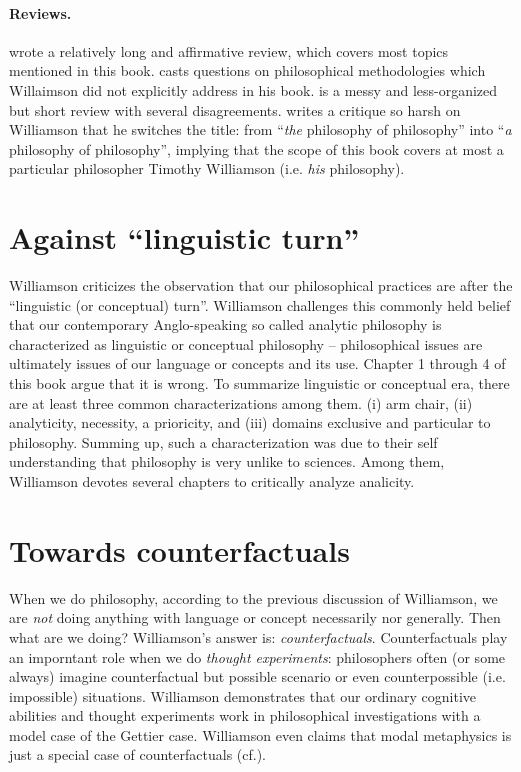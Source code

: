 \documentclass[
10pt, %
a4paper, %
twocolumn, %
landscape %
]{article}
\begin{document}
\paragraph{Reviews.}
\cite{Russell2010} wrote a relatively long and affirmative review, which covers most topics mentioned in this book. 
\cite{Kornblith2009} casts questions on philosophical methodologies which Willaimson did not explicitly address in his book. 
\cite{Eklund2010} is a messy and less-organized but short review with several disagreements. 
\cite{Hacker2008} writes a critique so harsh on Williamson that he switches the title: from ``\emph{the} philosophy of philosophy'' into  ``\emph{a} philosophy of philosophy'', implying that the scope of this book covers at most a particular philosopher Timothy Williamson (i.e. \emph{his} philosophy). 


\section*{Against ``linguistic turn''}
Williamson criticizes the observation that our philosophical practices are after the ``linguistic (or conceptual) turn''.
Williamson challenges this commonly held belief that our contemporary Anglo-speaking so called analytic philosophy is characterized as linguistic or conceptual philosophy -- philosophical issues are ultimately issues of our language or concepts and its use. Chapter 1 through 4 of this book argue that it is wrong. 
To summarize linguistic or conceptual era, there are at least three common characterizations among them. 
(i) arm chair, (ii) analyticity, necessity, a prioricity, and (iii) domains exclusive and particular to philosophy. 
Summing up, such a characterization was due to their self understanding that philosophy is very unlike to sciences. 
Among them, Williamson devotes several chapters to critically analyze analicity. 


\section*{Towards counterfactuals}
When we do philosophy, according to the previous discussion of Williamson, 
we are \emph{not} doing anything with language or concept necessarily nor generally. 
Then what are we doing? 
Williamson's answer is: \emph{counterfactuals}. 
Counterfactuals play an imporntant role when we do \emph{thought experiments}: philosophers often (or some always) imagine counterfactual but possible scenario or even counterpossible (i.e. impossible) situations. 
Williamson demonstrates that our ordinary cognitive abilities and thought experiments work in philosophical investigations with a model case of the Gettier case. 
Williamson even claims that modal metaphysics is just a special case of counterfactuals (cf.\cite{Williamson2013a}). 
\end{document}
